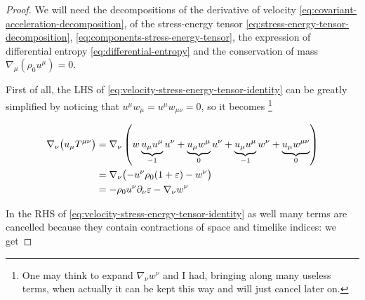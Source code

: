 \documentclass[main.tex]{subfiles}
\begin{document}
\begin{proof}
    We will need the decompositions of
    the derivative of velocity \eqref{eq:covariant-acceleration-decomposition},
    of the stress-energy tensor \eqref{eq:stress-energy-tensor-decomposition}, \eqref{eq:components-stress-energy-tensor},
    the expression of differential entropy \eqref{eq:differential-entropy}
    and the conservation of mass \(\nabla_\mu (\rho_0 u^\mu) = 0\).

    First of all, the LHS of \eqref{eq:velocity-stress-energy-tensor-identity} can be greatly simplified by noticing that \(u^\mu w_\mu = u^\mu w_{\mu \nu} = 0\), so it becomes \footnote{One may think to expand \(\nabla_\nu w^\nu\) and I had, bringing along many useless terms, when actually it can be kept this way and will just cancel later on.}

    \vspace{-1cm}

    \begin{subequations}
    \begin{align}
        \nabla_\nu \qty(u_\mu T ^{\mu \nu}) &= \nabla_\nu \left( w \underbrace{u_\mu u^\mu}_{-1} u^\nu + \underbrace{u_\mu w^\mu}_{0} u^\nu + \underbrace{ u_\mu u^\mu}_{-1} w^\nu + \underbrace{u_\mu w ^{\mu \nu}}_{0}\right) \\
         &= \nabla_\nu \qty(- u^\nu \rho_0 (1 + \varepsilon) - w^\nu) \\
         &=  - \rho_0 u^\nu \partial_\nu \varepsilon - \nabla_\nu w^\nu
    \end{align}
    \end{subequations}

    In the RHS of \eqref{eq:velocity-stress-energy-tensor-identity} as well many terms are cancelled because they contain contractions of space and timelike indices: we get


\end{proof}
\end{document}
